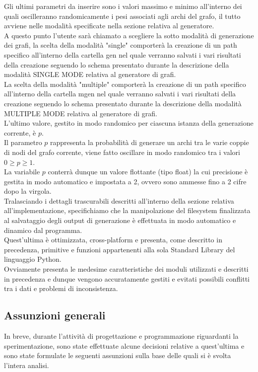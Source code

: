 Gli ultimi parametri da inserire sono i valori massimo e minimo all'interno dei quali oscilleranno randomicamente i pesi associati agli archi del grafo, il tutto avviene nelle modalità specificate nella sezione relativa al generatore.\\

A questo punto l'utente sarà chiamato a scegliere la sotto modalità di generazione dei grafi, la scelta della modalità "single" comporterà la creazione di un path specifico all'interno della cartella gen nel quale verranno salvati i vari risultati della creazione seguendo lo schema presentato durante la descrizione della modalità SINGLE MODE relativa al generatore di grafi.\\
La scelta della modalità "multiple" comporterà la creazione di un path specifico all'interno della cartella mgen nel quale verranno salvati i vari risultati della creazione seguendo lo schema presentato durante la descrizione della modalità MULTIPLE MODE relativa al generatore di grafi. \\

L'ultimo valore, gestito in modo randomico per ciascuna istanza della generazione corrente, è $p$.\\
Il parametro $p$ rappresenta la probabilità di generare un archi tra le varie coppie di nodi del grafo corrente, viene fatto oscillare in modo randomico tra i valori \(0 \geq p \geq 1\).\\
La variabile $p$ conterrà dunque un valore flottante (tipo float) la cui precisione è gestita in modo automatico e impostata a 2, ovvero sono ammesse fino a 2 cifre dopo la virgola.\\

Tralasciando i dettagli trascurabili descritti all'interno della sezione relativa all'implementazione, specifichiamo che la manipolazione del filesystem finalizzata al salvataggio degli output di generazione è effettuata in modo automatico e dinamico dal programma.\\
Quest'ultima è ottimizzata, cross-platform e presenta, come descritto in precedenza, primitive e funzioni appartenenti alla sola Standard Library del linguaggio Python.\\
Ovviamente presenta le medesime caratteristiche dei moduli utilizzati e descritti in precedenza e dunque vengono accuratamente gestiti e evitati possibili conflitti tra i dati e problemi di inconsistenza.\\

\subsection{Assunzioni generali}
\justify
In breve, durante l'attività di progettazione e programmazione riguardanti la sperimentazione, sono state effettuate alcune decisioni relative a quest'ultima e sono state formulate le seguenti assunzioni sulla base delle quali si è svolta l'intera analisi.\\

